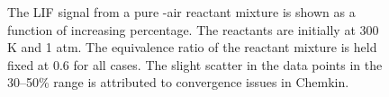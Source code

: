 \begin{figure}

\centering



\caption[Syngas-alkane-air flame results - III]{The LIF signal from a pure -air reactant mixture is shown as a function of increasing  percentage. The reactants are initially at 300 K and 1 atm. The equivalence ratio of the reactant mixture is held fixed at 0.6 for all cases. The slight scatter in the data points in the 30--50\%  range is attributed to convergence issues in Chemkin.}

\label{fig:methane-addition}

\end{figure}
